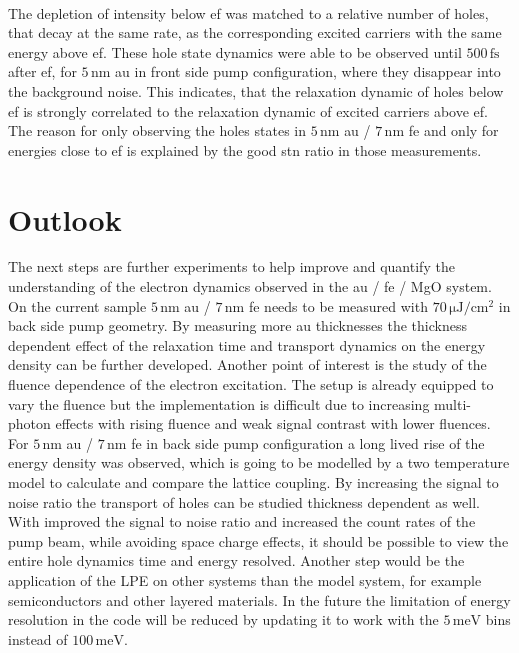 \documentclass[a4paper,12pt,twoside]{article}
\begin{document}
\\
    The depletion of intensity below \gls{ef} was matched to a relative number of holes, that decay at the same rate, as the corresponding excited carriers with the same energy above \gls{ef}. These hole state dynamics were able to be observed until $500\,\mathrm{fs}$ after \gls{ef}, for $5\,\mathrm{nm}$ \gls{au} in front side pump configuration, where they disappear into the background noise. This indicates, that the relaxation dynamic of holes below \gls{ef} is strongly correlated to the relaxation dynamic of excited carriers above \gls{ef}. The reason for only observing the holes states in $5\,\mathrm{nm}$ \gls{au} / $7\,\mathrm{nm}$ \gls{fe} and only for energies close to \gls{ef} is explained by the good \gls{stn} ratio in those measurements.
    
    \section{Outlook}
        \label{chapO}
The next steps are further experiments to help improve and quantify the understanding of the electron dynamics observed in the \gls{au} / \gls{fe} / MgO system. On the current sample $5\,\mathrm{nm}$ \gls{au} / $7\,\mathrm{nm}$ \gls{fe} needs to be measured with $70\,\mathrm{\mu J/cm^2}$ in back side pump geometry. By measuring more \gls{au} thicknesses the thickness dependent effect of the relaxation time and transport dynamics on the energy density can be further developed. Another point of interest is the study of the fluence dependence of the electron excitation. The setup is already equipped to vary the fluence but the implementation is difficult due to increasing multi-photon effects with rising fluence and weak signal contrast with lower fluences. For $5\,\mathrm{nm}$ \gls{au} / $7\,\mathrm{nm}$ \gls{fe} in back side pump configuration a long lived rise of the energy density was observed, which is going to be modelled by a two temperature model to calculate and compare the lattice coupling. By increasing the signal to noise ratio the transport of holes can be studied thickness dependent as well. With improved the signal to noise ratio and increased the count rates of the pump beam, while avoiding space charge effects, it should be possible to view the entire hole dynamics time and energy resolved. Another step would be the application of the \gls{LPE} on other systems than the model system, for example semiconductors and other layered materials. In the future the limitation of energy resolution in the code will be reduced by updating it to work with the $5\,\mathrm{meV}$ bins instead of $100\,\mathrm{meV}$.
    \newpage
\end{document}
